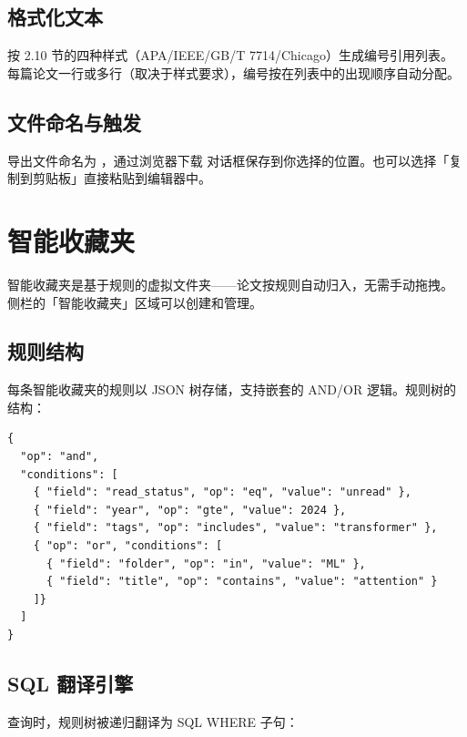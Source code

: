 \subsection{格式化文本}

按 2.10 节的四种样式（APA/IEEE/GB/T 7714/Chicago）生成编号引用列表。
每篇论文一行或多行（取决于样式要求），编号按在列表中的出现顺序自动分配。

\subsection{文件命名与触发}

导出文件命名为 ，通过浏览器下载
对话框保存到你选择的位置。也可以选择「复制到剪贴板」直接粘贴到编辑器中。

\section{智能收藏夹}

智能收藏夹是基于规则的虚拟文件夹——论文按规则自动归入，无需手动拖拽。
侧栏的「智能收藏夹」区域可以创建和管理。


\subsection{规则结构}

每条智能收藏夹的规则以 JSON 树存储，支持嵌套的 AND/OR 逻辑。规则树的结构：

\begin{verbatim}
{
  "op": "and",
  "conditions": [
    { "field": "read_status", "op": "eq", "value": "unread" },
    { "field": "year", "op": "gte", "value": 2024 },
    { "field": "tags", "op": "includes", "value": "transformer" },
    { "op": "or", "conditions": [
      { "field": "folder", "op": "in", "value": "ML" },
      { "field": "title", "op": "contains", "value": "attention" }
    ]}
  ]
}
\end{verbatim}

\subsection{SQL 翻译引擎}

查询时，规则树被递归翻译为 SQL WHERE 子句：

